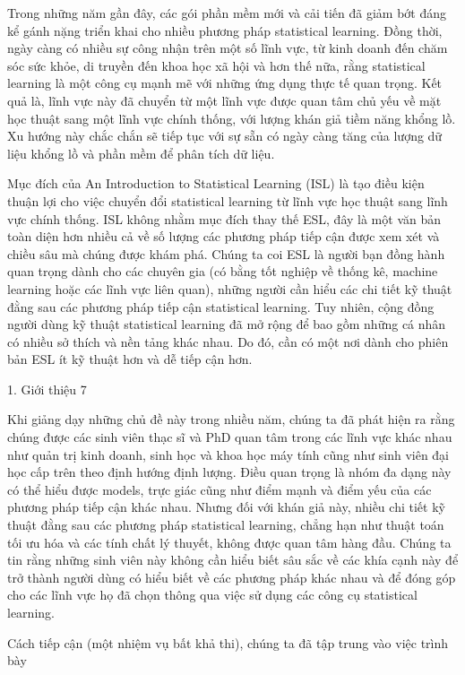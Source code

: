Trong những năm gần đây, các gói phần mềm mới và cải tiến đã giảm bớt đáng kể gánh nặng triển khai cho nhiều phương pháp statistical learning. Đồng thời, ngày càng có nhiều sự công nhận trên một số lĩnh vực, từ kinh doanh đến chăm sóc sức khỏe, di truyền đến khoa học xã hội và hơn thế nữa, rằng statistical learning là một công cụ mạnh mẽ với những ứng dụng thực tế quan trọng. Kết quả là, lĩnh vực này đã chuyển từ một lĩnh vực được quan tâm chủ yếu về mặt học thuật sang một lĩnh vực chính thống, với lượng khán giả tiềm năng khổng lồ. Xu hướng này chắc chắn sẽ tiếp tục với sự sẵn có ngày càng tăng của lượng dữ liệu khổng lồ và phần mềm để phân tích dữ liệu.

Mục đích của An Introduction to Statistical Learning (ISL) là tạo điều kiện thuận lợi cho việc chuyển đổi statistical learning từ lĩnh vực học thuật sang lĩnh vực chính thống. ISL không nhằm mục đích thay thế ESL, đây là một văn bản toàn diện hơn nhiều cả về số lượng các phương pháp tiếp cận được xem xét và chiều sâu mà chúng được khám phá. Chúng ta coi ESL là người bạn đồng hành quan trọng dành cho các chuyên gia (có bằng tốt nghiệp về thống kê, machine learning hoặc các lĩnh vực liên quan), những người cần hiểu các chi tiết kỹ thuật đằng sau các phương pháp tiếp cận statistical learning. Tuy nhiên, cộng đồng người dùng kỹ thuật statistical learning đã mở rộng để bao gồm những cá nhân có nhiều sở thích và nền tảng khác nhau. Do đó, cần có một nơi dành cho phiên bản ESL ít kỹ thuật hơn và dễ tiếp cận hơn.

1. Giới thiệu 7

Khi giảng dạy những chủ đề này trong nhiều năm, chúng ta đã phát hiện ra rằng chúng được các sinh viên thạc sĩ và PhD quan tâm trong các lĩnh vực khác nhau như quản trị kinh doanh, sinh học và khoa học máy tính cũng như sinh viên đại học cấp trên theo định hướng định lượng. Điều quan trọng là nhóm đa dạng này có thể hiểu được models, trực giác cũng như điểm mạnh và điểm yếu của các phương pháp tiếp cận khác nhau. Nhưng đối với khán giả này, nhiều chi tiết kỹ thuật đằng sau các phương pháp statistical learning, chẳng hạn như thuật toán tối ưu hóa và các tính chất lý thuyết, không được quan tâm hàng đầu. Chúng ta tin rằng những sinh viên này không cần hiểu biết sâu sắc về các khía cạnh này để trở thành người dùng có hiểu biết về các phương pháp khác nhau và để đóng góp cho các lĩnh vực họ đã chọn thông qua việc sử dụng các công cụ statistical learning.

Cách tiếp cận (một nhiệm vụ bất khả thi), chúng ta đã tập trung vào việc trình bày

